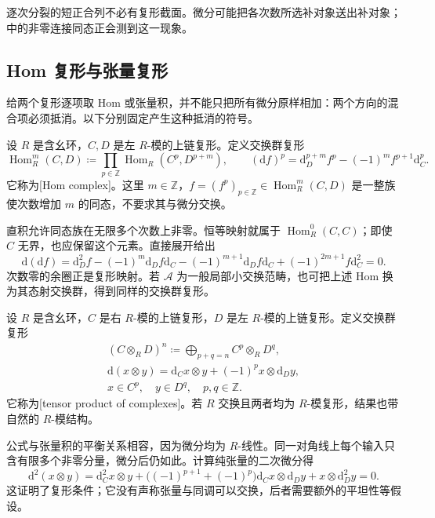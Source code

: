 逐次分裂的短正合列不必有复形截面。微分可能把各次数所选补对象送出补对象；中的非零连接同态正会测到这一现象。

\subsection{Hom 复形与张量复形}
\label{b4:subsec:0502:02}

给两个复形逐项取 Hom 或张量积，并不能只把所有微分原样相加：两个方向的混合项必须抵消。以下分别固定产生这种抵消的符号。

\begin{definition}\label{b4:def:hom-complex}
设 \(R\) 是含幺环，\(C,D\) 是左 \(R\)-模的上链复形。定义交换群复形
\[
\operatorname{Hom}_R^m(C,D)\coloneqq
\prod_{p\in\mathbb Z}\operatorname{Hom}_R(C^p,D^{p+m}),
\qquad
(\mathrm{d}f)^p=\mathrm{d}_D^{p+m}f^p-(-1)^m f^{p+1}\mathrm{d}_C^p.
\]
它称为[Hom complex]。这里 \(m\in\mathbb Z\)，\(f=(f^p)_{p\in\mathbb Z}\in\operatorname{Hom}_R^m(C,D)\) 是一整族使次数增加 \(m\) 的同态，不要求其与微分交换。
\end{definition}

直积允许同态族在无限多个次数上非零。恒等映射就属于 \(\operatorname{Hom}_R^0(C,C)\)；即使 \(C\) 无界，也应保留这个元素。直接展开给出
\[
\mathrm{d}(\mathrm{d}f)=\mathrm{d}_D^2f-(-1)^m \mathrm{d}_Df\mathrm{d}_C
-(-1)^{m+1}\mathrm{d}_Df\mathrm{d}_C+(-1)^{2m+1}f\mathrm{d}_C^2=0.
\]
次数零的余圈正是复形映射。若 \(\mathcal A\) 为一般局部小交换范畴，也可把上述 Hom 换为其态射交换群，得到同样的交换群复形。

\begin{definition}\label{b4:def:tensor-complex}
设 \(R\) 是含幺环，\(C\) 是右 \(R\)-模的上链复形，\(D\) 是左 \(R\)-模的上链复形。定义交换群复形
\[
\begin{gathered}
(C\otimes_R D)^n\coloneqq\bigoplus_{p+q=n}C^p\otimes_R D^q,\\
\mathrm{d}(x\otimes y)=\mathrm{d}_Cx\otimes y+(-1)^p x\otimes \mathrm{d}_Dy,\\
x\in C^p,\quad y\in D^q,\quad p,q\in\mathbb Z.
\end{gathered}
\]
它称为[tensor product of complexes]。若 \(R\) 交换且两者均为 \(R\)-模复形，结果也带自然的 \(R\)-模结构。
\end{definition}

公式与张量积的平衡关系相容，因为微分均为 \(R\)-线性。同一对角线上每个输入只含有限多个非零分量，微分后仍如此。计算纯张量的二次微分得
\[
\mathrm{d}^2(x\otimes y)=\mathrm{d}_C^2x\otimes y
+\bigl((-1)^{p+1}+(-1)^p\bigr)\mathrm{d}_Cx\otimes \mathrm{d}_Dy
+x\otimes \mathrm{d}_D^2y=0.
\]
这证明了复形条件；它没有声称张量与同调可以交换，后者需要额外的平坦性等假设。

